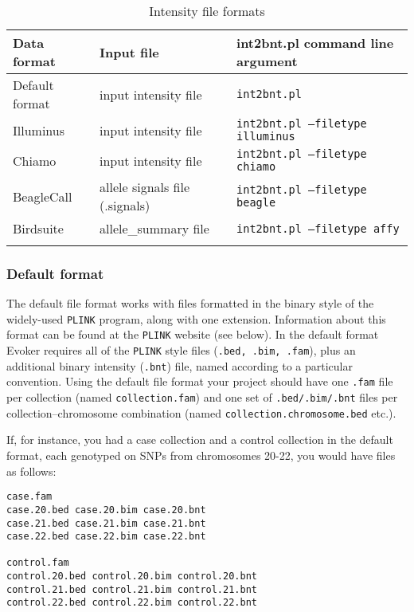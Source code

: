 \documentclass{article}
\begin{document}
\begin{table}
  \begin{center}
    \caption[Intensity file formats]{Intensity file formats}
    \vspace{0.2cm}
    \label{FileFormats}
    \begin{tabular}[p]{ l l l}
     \toprule[1.5pt]
      Data format & Input file & int2bnt.pl command line argument \\
      \midrule
		Default format & input intensity file & \texttt{int2bnt.pl}\\
		Illuminus & input intensity file & \texttt{int2bnt.pl --filetype illuminus}\\
		Chiamo & input intensity file & \texttt{int2bnt.pl --filetype chiamo}\\
		BeagleCall & allele signals file (.signals) & \texttt{int2bnt.pl --filetype beagle}\\
		Birdsuite & allele\_summary file & \texttt{int2bnt.pl --filetype affy}\\
      \addlinespace      
      \bottomrule[0.5pt]
    \end{tabular}
  \end{center}
\end{table}


\subsubsection{Default format}
The default file format works with files formatted in the binary style of the widely-used \texttt{PLINK} program, along with one extension. Information about this format can be found at the \texttt{PLINK} website (see below). In the default format Evoker requires all of the \texttt{PLINK} style files (\texttt{.bed, .bim, .fam}), plus an additional binary intensity (\texttt{.bnt}) file, named according to a particular convention. Using the default file format your project should have one \texttt{.fam} file per collection (named \texttt{collection.fam}) and one set of \texttt{.bed/.bim/.bnt} files per collection--chromosome combination (named \texttt{collection.chromosome.bed} etc.).

If, for instance, you had a case collection and a control collection in the default format, each genotyped on SNPs from chromosomes 20-22, you would have files as follows:

\begin{verbatim}
case.fam
case.20.bed case.20.bim case.20.bnt 
case.21.bed case.21.bim case.21.bnt 
case.22.bed case.22.bim case.22.bnt 

control.fam
control.20.bed control.20.bim control.20.bnt
control.21.bed control.21.bim control.21.bnt
control.22.bed control.22.bim control.22.bnt
\end{verbatim}
\end{document}
